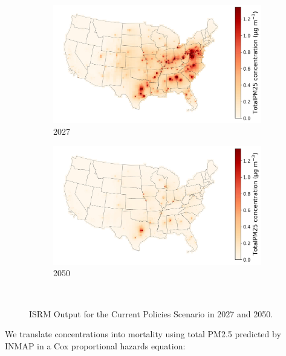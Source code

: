 \documentclass[a4paper]{article}
\theoremstyle{definition}
\theoremstyle{plain}
\begin{document}
\begin{figure}
    \centering
    \begin{subfigure}[b]{0.45\textwidth}
        \includegraphics[width=\textwidth]{Figures/Output/full-current-policies/GenX/ISRM_2027_TotalPM25_concentrationmap.jpg}
        \caption{2027}
        \label{Subfig1}
    \end{subfigure}
    \hfill
    \begin{subfigure}[b]{0.45\textwidth}
        \includegraphics[width=\textwidth]{Figures/Output/full-current-policies/GenX/ISRM_2050_TotalPM25_concentrationmap.jpg}
        \caption{2050}
        \label{Subfig2}
    \end{subfigure}\\
    \caption{ISRM Output for the Current Policies Scenario in 2027 and 2050.}
\end{figure}
We translate concentrations into mortality using total PM2.5 predicted by INMAP in a Cox proportional hazards equation:
\end{document}
